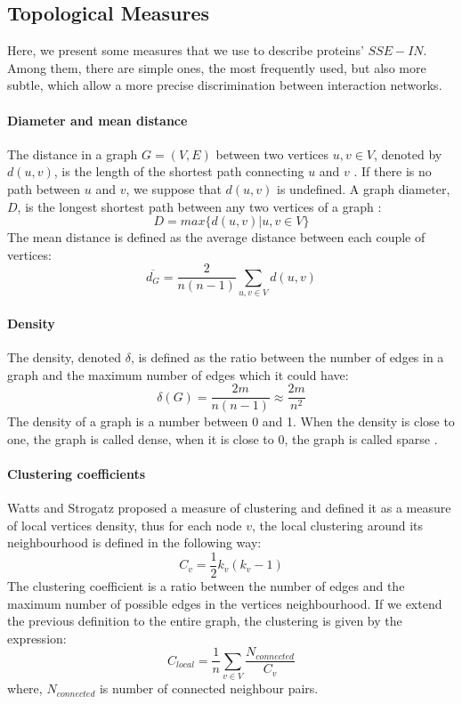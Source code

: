 \subsection {Topological Measures}
\label{subsec:topological_measures}
Here, we present some measures that we use to describe proteins' $SSE-IN$. Among them, there are simple ones, the most frequently used, but also more subtle, which allow a more precise discrimination between interaction networks.
\paragraph {Diameter and mean distance} The distance in a graph $G = (V,E)$ between two vertices $u,v \in V$, denoted by $d(u,v)$, is the length of the shortest path connecting $u$ and $v$ \cite{3161009}. If there is no path between $u$ and $v$, we suppose that $d(u,v)$ is undefined. A graph diameter, $D$, is the longest shortest path between any two vertices of a graph \cite{3161009}:
\[ D = max \{d(u,v) | u, v \in V \}\]
The mean distance is defined as the average distance between each couple of vertices:
\[ \overline{d_G} = \frac{2}{n(n-1)} \sum_{u,v\in V} d(u,v)\]
\paragraph{Density} The density, denoted $\delta$, is defined as the ratio between the number of edges in a graph and the maximum number of edges which it could have:
\[ \delta (G)=\frac{2m}{n(n-1)}\approx \frac{2m}{n^2}\]
The density of a graph is a number between 0 and 1. When the density is close to one, the graph is called dense, when it is close to $0$, the graph is called sparse \cite{coleman1983estimation}.
\paragraph{Clustering coefficients} Watts and Strogatz proposed a measure of clustering \cite{watts1999small} and defined it as a measure of local vertices density, thus for each node $v$, the local clustering around its neighbourhood is defined in the following way:
\[ C_v = \frac{1}{2}k_v(k_v-1)\]
The clustering coefficient is a ratio between the number of edges and the maximum number of possible edges in the vertices neighbourhood. If we extend the previous definition to the entire graph, the clustering is given by the expression:
\[ C_{local} = \frac{1}{n}\sum_{v\in V}\frac{N_{connected}}{C_v}\]
where, $N_{connected}$ is number of connected neighbour pairs.
